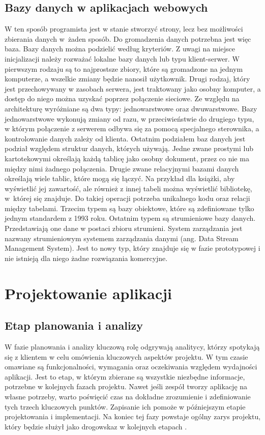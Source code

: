 \subsection{Bazy danych w aplikacjach webowych}

W ten sposób programista jest w stanie stworzyć strony, lecz bez możliwości zbierania danych w~żaden sposób. Do gromadzenia danych potrzebna jest więc baza. Bazy danych można podzielić według kryteriów. Z uwagi na miejsce inicjalizacji należy rozważać lokalne bazy danych lub typu klient-serwer. W pierwszym rodzaju są to najprostsze zbiory, które są gromadzone na jednym komputerze, a wszelkie zmiany będzie nanosił użytkownik. Drugi rodzaj, który jest przechowywany w zasobach serwera, jest traktowany jako osobny komputer, a dostęp do niego można uzyskać poprzez połączenie sieciowe. Ze względu na architekturę wyróżniane są dwa typy: jednowarstwowe oraz dwuwarstwowe. Bazy jednowarstwowe wykonują zmiany od razu, w przeciwieństwie do drugiego typu, w którym połączenie z serwerem odbywa się za pomocą specjalnego sterownika, a kontrolowanie danych zależy od klienta. Ostatnim podziałem baz danych jest podział względem struktur danych, których używają. Jedne zwane prostymi lub kartotekowymi określają każdą tablicę jako osobny dokument, przez co nie ma między nimi żadnego połączenia. Drugie zwane relacyjnymi bazami danych określają wiele tablic, które mogą się łączyć. Na przykład dla książki, aby wyświetlić jej zawartość, ale również z innej tabeli można wyświetlić bibliotekę, w~której się znajduje. Do takiej operacji potrzeba unikalnego kodu oraz relacji między tabelami. Trzecim typem są bazy obiektowe, które są zdefiniowane tylko jednym standardem z 1993 roku. Ostatnim typem są strumieniowe bazy danych. Przedstawiają one dane w postaci zbioru strumieni. System zarządzania jest nazwany strumieniowym systemem zarządzania danymi (ang. Data Stream Management System). Jest to nowy typ, który znajduje się w fazie prototypowej i nie istnieją dla niego żadne rozwiązania komercyjne.

\section{Projektowanie aplikacji}
\subsection{Etap planowania i analizy}

W fazie planowania i analizy kluczową rolę odgrywają analitycy, którzy spotykają się z klientem w celu omówienia kluczowych aspektów projektu. W tym czasie omawiane są funkcjonalności, wymagania oraz oczekiwania względem wydajności aplikacji. Jest to etap, w którym zbierane są wszystkie niezbędne informacje, potrzebne w kolejnych fazach projektu. Nawet jeśli zespół tworzy aplikację na własne potrzeby, warto poświęcić czas na dokładne zrozumienie i zdefiniowanie tych trzech kluczowych punktów. Zapisanie ich pomoże w późniejszym etapie projektowania i implementacji. Na koniec tej fazy powstaje ogólny zarys projektu, który będzie służył jako drogowskaz w kolejnych etapach \cite{Etapy}.

